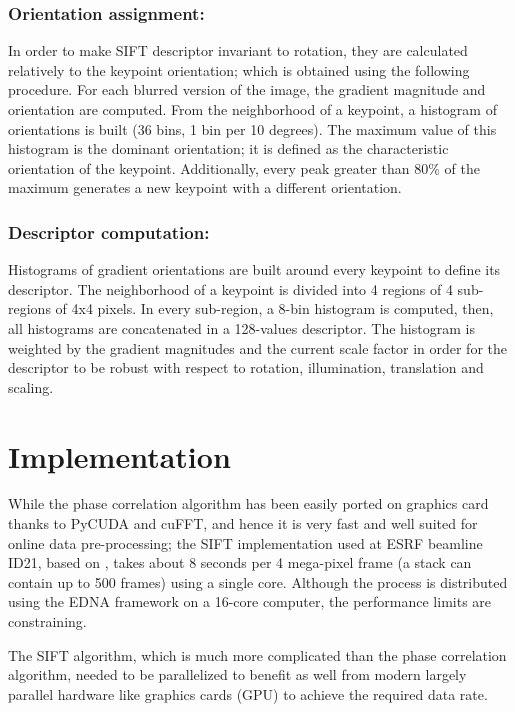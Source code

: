 \documentclass[preprint]{iucr}
\begin{document}
\subsubsection{Orientation assignment:}
In order to make SIFT descriptor invariant to rotation, they are calculated
relatively to the keypoint orientation; which is obtained using the following
procedure.
For each blurred version of the image, the gradient magnitude and orientation
are computed.
From the neighborhood of a keypoint, a histogram of orientations is built (36
bins, 1 bin per 10 degrees).
The maximum value of this histogram is the dominant orientation; it is defined
as the characteristic orientation of the keypoint.
Additionally, every peak greater than 80\% of the maximum generates a new
keypoint with a different orientation.



\subsubsection{Descriptor computation:}
Histograms of gradient orientations are built around every keypoint to define
its descriptor.
The neighborhood of a keypoint is divided into 4 regions of 4 sub-regions of 4x4
pixels.
In every sub-region, a 8-bin histogram is computed, then, all histograms
are concatenated in a 128-values descriptor.
The histogram is weighted by the gradient magnitudes and the current scale
factor in order for the descriptor to be robust with respect to rotation,
illumination, translation and scaling.


\section{Implementation}

While the phase correlation algorithm has been easily ported on graphics card
thanks to PyCUDA \cite{pyopencl} and cuFFT, and hence it is very fast and well
suited for online data pre-processing;
the SIFT implementation used at ESRF beamline ID21, based on \cite{ASIFT},
takes about 8 seconds per 4 mega-pixel frame  (a stack can contain up to  500
frames) using a single core.
Although the process is distributed using the EDNA framework \cite{edna} on a
16-core computer, the performance limits are constraining.

The SIFT algorithm, which is much more complicated than the phase
correlation algorithm, needed to be parallelized to benefit as well from modern
largely parallel hardware like graphics cards (GPU) to achieve the required
data rate.
\end{document}

